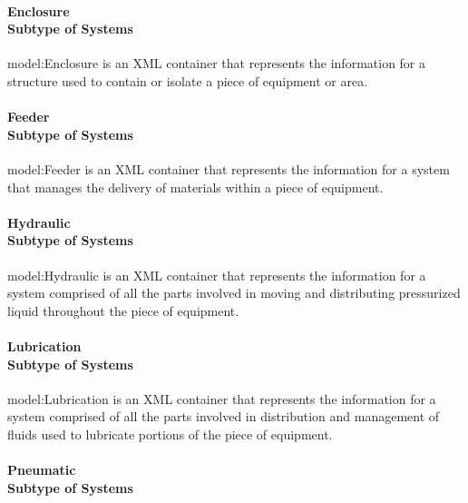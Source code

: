 \paragraph[Enclosure]{Enclosure \\ {\small Subtype of Systems}}\mbox{}
  \label{type:Enclosure}

\FloatBarrier

{model:Enclosure} is an XML container that represents the information for a structure used to contain or isolate a piece of equipment or area.

\paragraph[Feeder]{Feeder \\ {\small Subtype of Systems}}\mbox{}
  \label{type:Feeder}

\FloatBarrier

{model:Feeder} is an XML container that represents the information for a system that manages the delivery of materials within a piece of equipment.

\paragraph[Hydraulic]{Hydraulic \\ {\small Subtype of Systems}}\mbox{}
  \label{type:Hydraulic}

\FloatBarrier

{model:Hydraulic} is an XML container that represents the information for a system comprised of all the parts involved in moving and distributing pressurized liquid throughout the piece of equipment.

\paragraph[Lubrication]{Lubrication \\ {\small Subtype of Systems}}\mbox{}
  \label{type:Lubrication}

\FloatBarrier

{model:Lubrication} is an XML container that represents the information for a system comprised of all the parts involved in distribution and management of fluids used to lubricate portions of the piece of equipment.

\paragraph[Pneumatic]{Pneumatic \\ {\small Subtype of Systems}}\mbox{}
  \label{type:Pneumatic}

